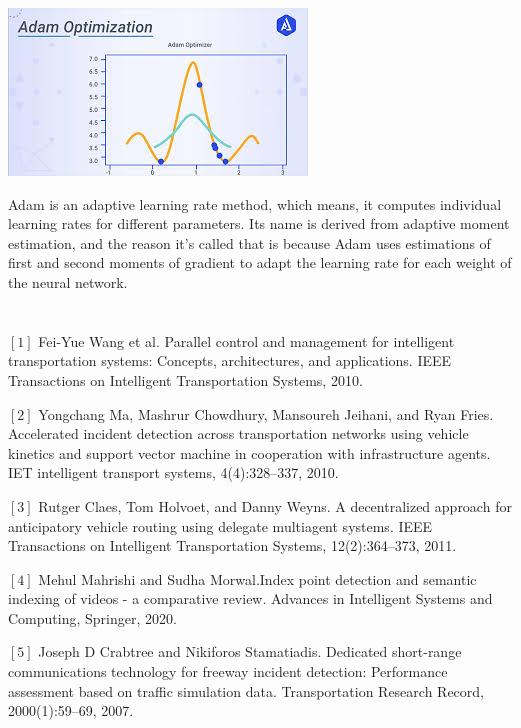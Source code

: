\documentclass[12pt]{article}
\newcommand{\nd}{\noindent}
\newcommand{\mainsize}{\fontsize{16pt}{12pt}\selectfont}
\begin{document}
\begin{center}
\centerline{\includegraphics[scale=.7]{ada.png}}
\end{center}

\nd Adam is an adaptive learning rate method, which means, it computes individual learning rates for different parameters. Its name is derived from adaptive moment estimation, and the reason it’s called that is because Adam uses estimations of first and second moments of gradient to adapt the learning rate for each weight of the neural network. 

\newpage 
\section*{\mainsize{\textbf{REFERENCES}}}
\addcontentsline{toc}{section}{\protect\numberline{}\mainsize{\textbf{REFERENCES}}}
$[1]$ Fei-Yue Wang et al. Parallel control and management for intelligent transportation systems: Concepts, architectures, and applications. IEEE Transactions on Intelligent Transportation Systems, 2010.

\nd $[2]$ Yongchang Ma, Mashrur Chowdhury, Mansoureh Jeihani, and Ryan Fries. Accelerated incident detection across transportation networks using vehicle kinetics and support vector machine in cooperation with infrastructure agents. IET intelligent transport systems, 4(4):328–337, 2010.

\nd $[3]$ Rutger Claes, Tom Holvoet, and Danny Weyns. A decentralized approach for anticipatory vehicle routing using delegate multiagent systems. IEEE Transactions on Intelligent Transportation Systems, 12(2):364–373, 2011.

\nd $[4]$  Mehul Mahrishi and Sudha Morwal.Index point detection and semantic indexing of videos - a comparative review. Advances in Intelligent Systems and Computing, Springer, 2020.

\nd $[5]$ Joseph D Crabtree and Nikiforos Stamatiadis. Dedicated short-range communications technology for freeway incident detection: Performance assessment based on traffic simulation data. Transportation Research Record, 2000(1):59–69, 2007.
\end{document}
